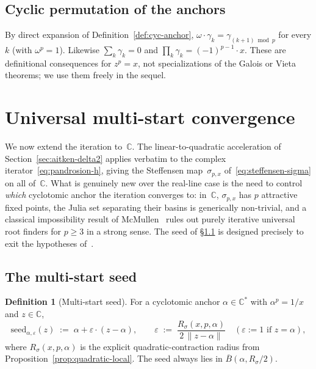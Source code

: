 \documentclass[11pt,a4paper]{article}
\theoremstyle{definition}
\newtheorem{definition}[theorem]{Definition}
\theoremstyle{remark}
\begin{document}
\subsection{Cyclic permutation of the anchors}

By direct expansion of Definition~\ref{def:cyc-anchor}, $\omega\cdot\gamma_k
= \gamma_{(k+1)\bmod p}$ for every $k$ (with $\omega^p = 1$). Likewise
$\sum_k \gamma_k = 0$ and $\prod_k \gamma_k = (-1)^{p-1}\cdot x$. These
are definitional consequences for $z^p = x$, not specializations of the
Galois or Vieta theorems; we use them freely in the sequel.

\section{Universal multi-start convergence}
\label{sec:multistart}

We now extend the iteration to~$\mathbb{C}$. The linear-to-quadratic
acceleration of Section~\ref{sec:aitken-delta2} applies verbatim to the
complex iterator~\eqref{eq:pandrosion-h}, giving the Steffensen
map~$\sigma_{p,x}$ of~\eqref{eq:steffensen-sigma} on all of~$\mathbb{C}$.
What is genuinely new over the real-line case is the need to control
\emph{which} cyclotomic anchor the iteration converges to: in~$\mathbb{C}$,
$\sigma_{p,x}$ has $p$ attractive fixed points, the Julia set
separating their basins is generically non-trivial, and a classical
impossibility result of McMullen~\cite{mcmullen} rules out purely
iterative universal root finders for $p \geq 3$ in a strong
sense. The seed of \S\ref{sec:seed} is designed precisely to exit the
hypotheses of~\cite{mcmullen}.

\subsection{The multi-start seed}
\label{sec:seed}

\begin{definition}[Multi-start seed]\label{def:seed}
For a cyclotomic anchor $\alpha \in \mathbb{C}^\ast$ with $\alpha^p = 1/x$
and $z \in \mathbb{C}$,
\begin{equation}\label{eq:multistart-seed}
  \mathrm{seed}_{\alpha, \varepsilon}(z)
  \;:=\; \alpha + \varepsilon \cdot (z - \alpha),
  \qquad
  \varepsilon
  \;:=\; \frac{R_\sigma(x, p, \alpha)}{2\,\|z - \alpha\|}
  \quad (\varepsilon := 1 \text{ if } z = \alpha),
\end{equation}
where $R_\sigma(x, p, \alpha)$ is the explicit quadratic-contraction
radius from Proposition~\ref{prop:quadratic-local}. The seed always
lies in $\overline{B}(\alpha, R_\sigma/2)$.
\end{definition}
\end{document}

